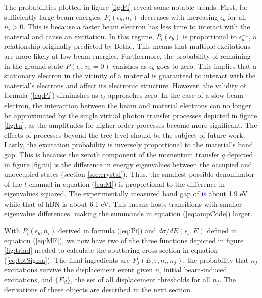 \documentclass[twoside,twocolumn,9pt]{article}
\begin{document}
The probabilities plotted in figure \ref{fig:Pi} reveal some notable
trends.
First, for sufficiently large beam energies, $P_i(\epsilon_b, n_i)$ decreases
with increasing $\epsilon_b$ for all $n_i>0$.
This is because a faster beam electron has less time to interact with the
material and cause an excitation.
In this regime, $P_i(\epsilon_b)$ is proportional to $\epsilon_b^{-1}$, a
relationship originally predicted by Bethe.\cite{Bethe1930, Inokuti1967,
Kretschmer2020}
This means that multiple excitations are more likely at low beam energies.
Furthermore, the probability of remaining in the ground state $P(\epsilon_b,
n_i=0)$ vanishes as $\epsilon_b$ goes to zero.
This implies that a stationary electron in the vicinity of a material is
guaranteed to interact with the material's electrons and affect its electronic
structure.
However, the validity of formula (\ref{eq:Pi}) diminishes as $\epsilon_b$
approaches zero.
In the case of a slow beam electron, the interaction between the beam and
material electrons can no longer be approximated by the single virtual photon
transfer processes depicted in figure \ref{fig:tu}, as the amplitudes for
higher-order processes become more significant.
The effects of processes beyond the tree-level should be the subject of future
work.
Lastly, the excitation probability is inversely proportional to the material's
band gap.
This is because the zeroth component of the momentum transfer $q$ depicted in
figure \ref{fig:tu} is the difference in energy eigenvalues between the
occupied and unoccupied states (section \ref{sec:crystal}).
Thus, the smallest possible denominator of the $t$-channel in equation
(\ref{eq:M}) is proportional to the difference in eigenvalues squared.
The experimentally measured band gap of  \textcolor{blue}{is} about
1.9 eV \cite{Gusakova2017} while that of hBN is about 6.1 eV.\cite{Elias2019}
This means  hosts transitions with smaller eigenvalue differences,
making the summands in equation (\ref{eq:ampCode}) larger.

With $P_i(\epsilon_b, n_i)$ derived in formula (\ref{eq:Pi}) and
$d\sigma/dE(\epsilon_b, E)$ defined in equation (\ref{eq:MF}), we now have two
of the three functions depicted in figure \ref{fig:triad} needed to calculate
the sputtering cross section in equation (\ref{eq:totSigma}).
The final ingredients are $P_f(E, \tau, n_i, n_f)$, the probability that $n_f$
excitations survive the displacement event given $n_i$ initial beam-induced
excitations, and $\{E_d\}$, the set of all displacement thresholds for all
$n_f$.
The derivations of these objects are described in the next section.
\end{document}
